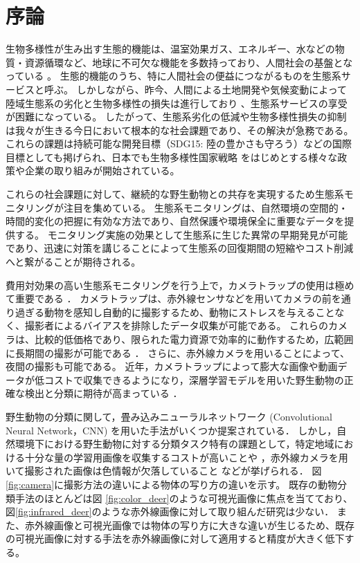 \documentclass[a4paper,11pt,nomag]{jsreport}
\begin{document}
\chapter*{序論}

生物多様性が生み出す生態的機能は、温室効果ガス、エネルギー、水などの物質・資源循環など、地球に不可欠な機能を多数持っており、人間社会の基盤となっている \cite{millennium-ecosystem2005,cardinale2011}。
生態的機能のうち、特に人間社会の便益につながるものを生態系サービスと呼ぶ。
しかしながら、昨今、人間による土地開発や気候変動によって陸域生態系の劣化と生物多様性の損失は進行しており \cite{newbold2015,isbell2017}、生態系サービスの享受が困難になっている。
したがって、生態系劣化の低減や生物多様性損失の抑制は我々が生きる今日において根本的な社会課題であり、その解決が急務である。
これらの課題は持続可能な開発目標（SDG15: 陸の豊かさも守ろう）などの国際目標としても掲げられ、日本でも生物多様性国家戦略 \cite{biodiversity2023}をはじめとする様々な政策や企業の取り組みが開始されている。

これらの社会課題に対して、継続的な野生動物との共存を実現するため生態系モニタリングが注目を集めている。
生態系モニタリングは、自然環境の空間的・時間的変化の把握に有効な方法であり、自然保護や環境保全に重要なデータを提供する。
モニタリング実施の効果として生態系に生じた異常の早期発見が可能であり、迅速に対策を講じることによって生態系の回復期間の短縮やコスト削減へと繋がることが期待される。

費用対効果の高い生態系モニタリングを行う上で，カメラトラップの使用は極めて重要である \cite{jia2022}．
カメラトラップは、赤外線センサなどを用いてカメラの前を通り過ぎる動物を感知し自動的に撮影するため、動物にストレスを与えることなく、撮影者によるバイアスを排除したデータ収集が可能である\cite{newey2015,zhu2017}。
これらのカメラは、比較的低価格であり、限られた電力資源で効率的に動作するため，広範囲に長期間の撮影が可能である \cite{schneider2018, carl2020}．
さらに、赤外線カメラを用いることによって、夜間の撮影も可能である。
近年，カメラトラップによって膨大な画像や動画データが低コストで収集できるようになり，深層学習モデルを用いた野生動物の正確な検出と分類に期待が高まっている \cite{tan2022}．

野生動物の分類に関して，畳み込みニューラルネットワーク (Convolutional Neural Network，CNN) を用いた手法がいくつか提案されている．
しかし，自然環境下における野生動物に対する分類タスク特有の課題として，特定地域における十分な量の学習用画像を収集するコストが高いことや \cite{schneider2020}，赤外線カメラを用いて撮影された画像は色情報が欠落していること \cite{kishimoto2023}などが挙げられる．
図 \ref{fig:camera}に撮影方法の違いによる物体の写り方の違いを示す。
既存の動物分類手法のほとんどは図 \ref{fig:color_deer}のような可視光画像に焦点を当てており、図\ref{fig:infrared_deer}のような赤外線画像に対して取り組んだ研究は少ない．
また、赤外線画像と可視光画像では物体の写り方に大きな違いが生じるため、既存の可視光画像に対する手法を赤外線画像に対して適用すると精度が大きく低下する。
\end{document}
